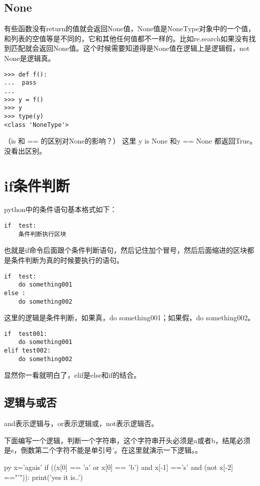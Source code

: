\documentclass[12pt,oneside]{book}
\begin{document}
\begin{common-format}
\subsection{None}
有些函数没有return的值就会返回None值，None值是NoneType对象中的一个值，和列表的空值等是不同的，它和其他任何值都不一样的。比如re.search如果没有找到匹配就会返回None值。这个时候需要知道得是None值在逻辑上是逻辑假，not None是逻辑真。
\begin{Verbatim}
>>> def f():
...  pass
... 
>>> y = f()
>>> y
>>> type(y)
<class 'NoneType'>
\end{Verbatim}

（is 和 == 的区别对None的影响？） 这里 y is None 和y == None 都返回True。没看出区别。


\section{if条件判断}
python中的条件语句基本格式如下：
\begin{Verbatim}
if  test:
    条件判断执行区块
\end{Verbatim}

也就是if命令后面跟个条件判断语句，然后记住加个冒号，然后后面缩进的区块都是条件判断为真的时候要执行的语句。

\begin{Verbatim}
if  test:
    do something001
else :
    do something002
\end{Verbatim}

这里的逻辑是条件判断，如果真，do something001；如果假，do something002。

\begin{Verbatim}
if  test001:
    do something001
elif test002:
    do something002
\end{Verbatim}

显然你一看就明白了，elif是else和if的结合。


\subsection{逻辑与或否}
and表示逻辑与，or表示逻辑或，not表示逻辑否。

下面编写一个逻辑，判断一个字符串，这个字符串开头必须是a或者b，结尾必须是s，倒数第二个字符不能是单引号'。在这里就演示一下逻辑。。
\begin{xverbatim}[129]{py}
x='agais'
if ((x[0] == 'a' or x[0] == 'b')
    and x[-1] =='s'
    and (not x[-2] =="'")):
    print('yes it is..')
\end{xverbatim}




\end{common-format}
\end{document}
